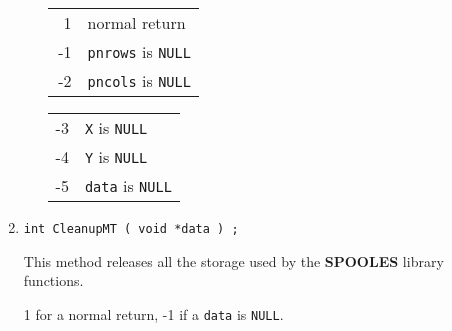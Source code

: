 \begin{enumerate}
\begin{itemize}
      \begin{center}
      \begin{tabular}[t]{rl}
      ~1 & normal return \\
      -1 & \texttt{pnrows} is \texttt{NULL} \\
      -2 & \texttt{pncols} is \texttt{NULL}
      \end{tabular}
      \begin{tabular}[t]{rl}
      -3 & \texttt{X} is \texttt{NULL} \\
      -4 & \texttt{Y} is \texttt{NULL} \\
      -5 & \texttt{data} is \texttt{NULL}
      \end{tabular}
      \end{center}
      \end{itemize}
\item
\begin{verbatim}
int CleanupMT ( void *data ) ;
\end{verbatim}
This method releases all the storage used by the {\bf SPOOLES}
library functions.
\par {}
1 for a normal return,
-1 if a {\tt data} is {\tt NULL}.
\end{enumerate}
\par

